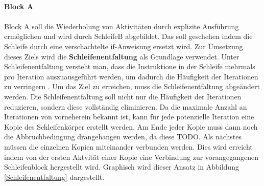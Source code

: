     \\
    \textbf{Block A}\\
    \\
    Block A soll die Wiederholung von Aktivitäten durch explizite Ausführung ermöglichen und wird durch SchleifeB abgebildet.
    Das soll geschehen indem die Schleife durch eine verschachtelte if-Anweisung ersetzt wird.
    Zur Umsetzung dieses Ziels wird die \textbf{Schleifenentfaltung} als Grundlage verwendet.
    Unter Schleifenentfaltung versteht man, dass die Instruktione in der Schleife mehrmals pro Iteration auszuausgeführt werden, um dadurch die Häufigkeit der Iterationen zu verringern \cite{9}.
    Um das Ziel zu erreichen, muss die Schleifenentfaltung abgeändert werden.
    Die Schleifenentfaltung soll nicht nur die Häufigkeit der Iterationen reduzieren, sondern diese vollständig eliminieren.
    Da die maximale Anzahl an Iterationen von vorneherein bekannt ist, kann für jede potenzielle Iteration eine Kopie des Schleifenkörper erstellt werden. 
    Am Ende jeder Kopie muss dann noch die Abbruchbedingung drangehangen werden, da diese TODO.
    Als nächstes müssen die einzelnen Kopien miteinander verbunden werden.
    Dies wird erreicht indem von der ersten Aktvität einer Kopie eine Verbindung zur vorangegangenen Schleifenblock hergestellt wird.
    Graphisch wird dieser Ansatz in Abbildung \ref{Schleifenentfaltung} dargestellt.

